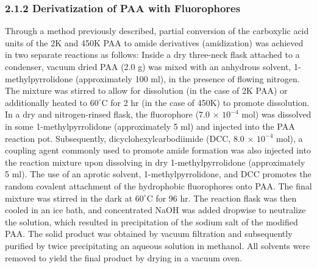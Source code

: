 \documentclass[journal=mamobx,manuscript=article]{achemso}
\begin{document}
\subsubsection{2.1.2 Derivatization of PAA with Fluorophores}  %
    \label{sec-derivPAA}

Through a method previously described, \cite{weber1954fluorescent,Anghel1998} partial conversion of the carboxylic acid units of the 2K and 450K PAA to amide derivatives (amidization) was achieved in two separate reactions as follows:  Inside a dry three-neck flask attached to a condenser, vacuum dried PAA (2.0 g) was mixed with an anhydrous solvent, 1-methylpyrrolidone (approximately 100 ml), in the presence of flowing nitrogen.  The mixture was stirred to allow for dissolution (in the case of 2K PAA) or additionally heated to $60^{\circ}$C for 2 hr (in the case of 450K) to promote dissolution.  In a dry and nitrogen-rinsed flask, the fluorophore (7.0 $\times$ $10^{-4}$ mol) was dissolved in some 1-methylpyrrolidone (approximately 5 ml) and injected into the PAA reaction pot.  Subsequently, dicyclohexylcarbodiimide (DCC, 8.0 $\times$ $10^{-4}$ mol), a coupling agent commonly used to promote amide formation was also injected into the reaction mixture upon dissolving in dry 1-methylpyrrolidone (approximately 5 ml).  The use of an aprotic solvent, 1-methylpyrrolidone, and DCC promotes the random covalent attachment of the hydrophobic fluorophores onto PAA.\cite{Anghel1998}  The final mixture was stirred in the dark at $60^{\circ}$C for 96 hr.  The reaction flask was then cooled in an ice bath, and concentrated NaOH was added dropwise to neutralize the solution, which resulted in precipitation of the sodium salt of the modified PAA.  The solid product was obtained by vacuum filtration and subsequently purified by twice precipitating an aqueous solution in methanol.  All solvents were removed to yield the final product by drying in a vacuum oven.
\end{document}
